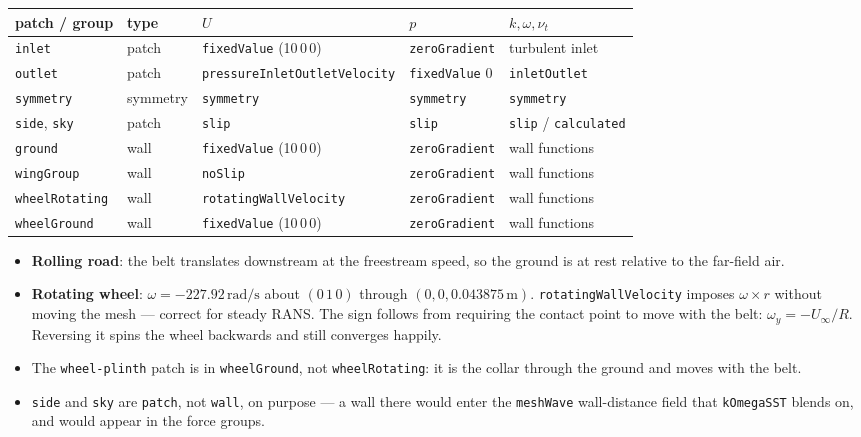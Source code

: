 \documentclass[11pt,a4paper]{article}
\providecommand{\SI}[2]{\ensuremath{#1\,\mathrm{#2}}}
\begin{document}
\begin{center}\small
\begin{tabular}{@{}lllll@{}}
\toprule
patch / group & type & $U$ & $p$ & $k,\omega,\nu_t$\\
\midrule
\texttt{inlet}  & patch & \texttt{fixedValue} (10\,0\,0) & \texttt{zeroGradient} & turbulent inlet\\
\texttt{outlet} & patch & \texttt{pressureInletOutletVelocity} & \texttt{fixedValue} 0 & \texttt{inletOutlet}\\
\texttt{symmetry} & symmetry & \texttt{symmetry} & \texttt{symmetry} & \texttt{symmetry}\\
\texttt{side}, \texttt{sky} & patch & \texttt{slip} & \texttt{slip} & \texttt{slip} / \texttt{calculated}\\
\texttt{ground} & wall & \texttt{fixedValue} (10\,0\,0) & \texttt{zeroGradient} & wall functions\\
\texttt{wingGroup} & wall & \texttt{noSlip} & \texttt{zeroGradient} & wall functions\\
\texttt{wheelRotating} & wall & \texttt{rotatingWallVelocity} & \texttt{zeroGradient} & wall functions\\
\texttt{wheelGround} & wall & \texttt{fixedValue} (10\,0\,0) & \texttt{zeroGradient} & wall functions\\
\bottomrule
\end{tabular}
\end{center}

\begin{itemize}
\item \textbf{Rolling road}: the belt translates downstream at the
  freestream speed, so the ground is at rest relative to the far-field air.
\item \textbf{Rotating wheel}: $\omega = \SI{-227.92}{rad/s}$ about
  $(0\,1\,0)$ through $(0,0,\SI{0.043875}{m})$.
  \texttt{rotatingWallVelocity} imposes $\omega\times r$ without moving the
  mesh --- correct for steady RANS. The sign follows from requiring the
  contact point to move with the belt:
  $\omega_y = -U_\infty/R$. Reversing it spins the wheel backwards and still
  converges happily.
\item The \texttt{wheel-plinth} patch is in \texttt{wheelGround}, not
  \texttt{wheelRotating}: it is the collar through the ground and moves with
  the belt.
\item \texttt{side} and \texttt{sky} are \texttt{patch}, not \texttt{wall},
  on purpose --- a wall there would enter the \texttt{meshWave} wall-distance
  field that \texttt{kOmegaSST} blends on, and would appear in the force
  groups.
\end{itemize}
\end{document}
